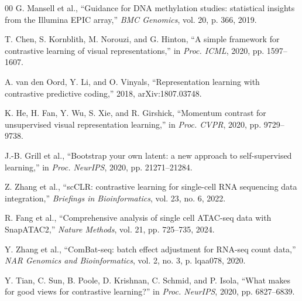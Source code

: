 \documentclass[conference]{IEEEtran}
\begin{document}
\begin{thebibliography}{00}
G. Mansell et al., ``Guidance for DNA methylation studies: statistical insights from the Illumina EPIC array,'' \textit{BMC Genomics}, vol. 20, p. 366, 2019.

T. Chen, S. Kornblith, M. Norouzi, and G. Hinton, ``A simple framework for contrastive learning of visual representations,'' in \textit{Proc. ICML}, 2020, pp. 1597--1607.

A. van den Oord, Y. Li, and O. Vinyals, ``Representation learning with contrastive predictive coding,'' 2018, arXiv:1807.03748.

K. He, H. Fan, Y. Wu, S. Xie, and R. Girshick, ``Momentum contrast for unsupervised visual representation learning,'' in \textit{Proc. CVPR}, 2020, pp. 9729--9738.

J.-B. Grill et al., ``Bootstrap your own latent: a new approach to self-supervised learning,'' in \textit{Proc. NeurIPS}, 2020, pp. 21271--21284.

Z. Zhang et al., ``scCLR: contrastive learning for single-cell RNA sequencing data integration,'' \textit{Briefings in Bioinformatics}, vol. 23, no. 6, 2022.

R. Fang et al., ``Comprehensive analysis of single cell ATAC-seq data with SnapATAC2,'' \textit{Nature Methods}, vol. 21, pp. 725--735, 2024.

Y. Zhang et al., ``ComBat-seq: batch effect adjustment for RNA-seq count data,'' \textit{NAR Genomics and Bioinformatics}, vol. 2, no. 3, p. lqaa078, 2020.

Y. Tian, C. Sun, B. Poole, D. Krishnan, C. Schmid, and P. Isola, ``What makes for good views for contrastive learning?'' in \textit{Proc. NeurIPS}, 2020, pp. 6827--6839.

\end{thebibliography}
\end{document}
